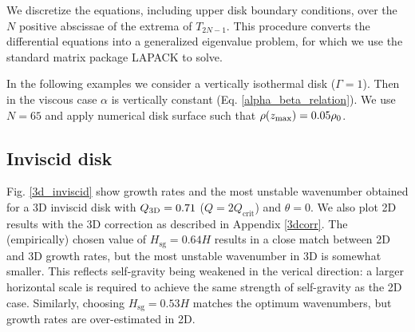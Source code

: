 We discretize the equations, including upper disk boundary conditions,
over the $N$ positive abscissae of the extrema of $T_{2N-1}$. This
procedure converts the differential equations into a generalized
eigenvalue problem, for which we use the standard matrix package
LAPACK to solve.  

In the following examples we consider a vertically isothermal disk
($\Gamma=1$). Then in the viscous case $\alpha$ is vertically
constant (Eq. \ref{alpha_beta_relation}). We use $N=65$  and apply
numerical disk surface such that $\rho(z_\mathrm{max})=0.05\rho_0$.   

\subsection{Inviscid disk}

Fig. \ref{3d_inviscid} show growth rates and the most unstable wavenumber
obtained for a 3D inviscid disk with $Q_\mathrm{3D}=0.71$
($Q=2Q_\mathrm{crit}$) and $\theta=0$. We also plot 2D
results with the 3D correction as described in Appendix
\ref{3dcorr}. The (empirically) chosen value of
$H_\mathrm{sg}=0.64H$ results in a close match between 2D and 3D
growth rates, but the most unstable wavenumber in 3D is somewhat smaller. 
This reflects self-gravity being weakened in the verical 
direction: a larger horizontal scale is required to achieve the same
strength of self-gravity as the 2D case. Similarly, 
choosing $H_\mathrm{sg}=0.53H$ matches the optimum wavenumbers, but
growth rates are over-estimated in 2D.    

